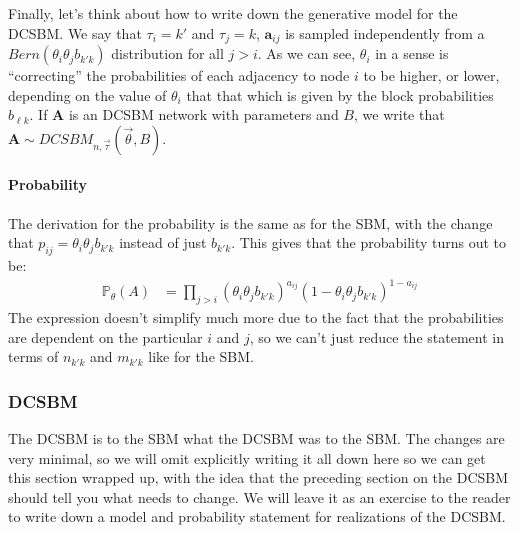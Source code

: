 \documentclass[letterpaper,10pt,english]{jupyterBook}
\begin{document}
\sphinxAtStartPar
Finally, let’s think about how to write down the generative model for the  DCSBM. We say that \(\tau_i = k'\) and \(\tau_j = k\), \(\mathbf a_{ij}\) is sampled independently from a \(Bern(\theta_i \theta_j b_{k'k})\) distribution for all \(j > i\). As we can see, \(\theta_i\) in a sense is “correcting” the probabilities of each adjacency to node \(i\) to be higher, or lower, depending on the value of \(\theta_i\) that that which is given by the block probabilities \(b_{\ell k}\). If \(\mathbf A\) is an  DCSBM network with parameters and \(B\), we write that \(\mathbf A \sim DCSBM_{n,\vec\tau}(\vec \theta, B)\).


\paragraph{Probability}
\label{\detokenize{representations/ch5/single-network-models_theory:id3}}
\sphinxAtStartPar
The derivation for the probability is the same as for the  SBM, with the change that \(p_{ij} = \theta_i \theta_j b_{k'k}\) instead of just \(b_{k'k}\). This gives that the probability turns out to be:
\begin{align*}
    \mathbb P_\theta(A) &= \prod_{j > i} \left(\theta_i \theta_j b_{k'k}\right)^{a_{ij}}\left(1 - \theta_i \theta_j b_{k'k}\right)^{1 - a_{ij}}
\end{align*}
\sphinxAtStartPar
The expression doesn’t simplify much more due to the fact that the probabilities are dependent on the particular \(i\) and \(j\), so we can’t just reduce the statement in terms of \(n_{k'k}\) and \(m_{k'k}\) like for the SBM.


\subsubsection{ DCSBM}
\label{\detokenize{representations/ch5/single-network-models_theory:a-posteriori-dcsbm}}
\sphinxAtStartPar
The  DCSBM is to the  SBM what the  DCSBM was to the  SBM. The changes are very minimal, so we will omit explicitly writing it all down here so we can get this section wrapped up, with the idea that the preceding section on the  DCSBM should tell you what needs to change. We will leave it as an exercise to the reader to write down a model and probability statement for realizations of the DCSBM.
\end{document}
